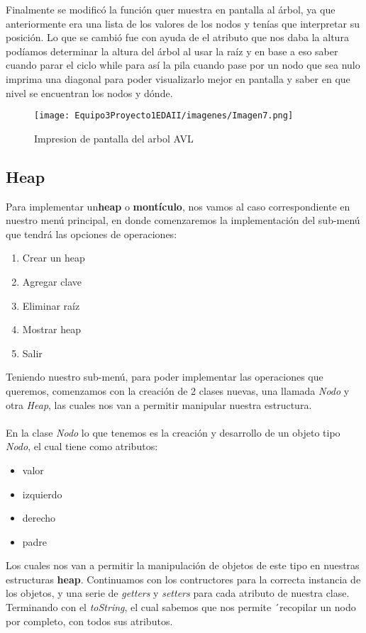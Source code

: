 \documentclass{report}
\begin{document}
Finalmente se modificó la función quer muestra en pantalla al árbol, ya que anteriormente era una lista de los valores de los nodos y tenías que interpretar su posición. Lo que se cambió fue con ayuda de el atributo que nos daba la altura podíamos determinar la altura del árbol al usar la raíz y en base a eso saber cuando parar el ciclo while para así la pila cuando pase por un nodo que sea nulo imprima una diagonal para poder visualizarlo mejor en pantalla y saber en que nivel se encuentran los nodos y dónde.
\begin{figure}[h]
        \centering
        \texttt{[image: Equipo3Proyecto1EDAII/imagenes/Imagen7.png]}
        \caption{Impresion de pantalla del arbol AVL}
        \label{fig:my_label}
\end{figure}


\subsection{Heap}
Para implementar un\textbf{heap} o \textbf{montículo}, nos vamos al caso correspondiente en nuestro menú principal, en donde comenzaremos la implementación del sub-menú que tendrá las opciones de operaciones:
\begin{enumerate}
    \item Crear un heap
    \item Agregar clave
    \item Eliminar raíz
    \item Mostrar heap
    \item Salir
\end{enumerate}
Teniendo nuestro sub-menú, para poder implementar las operaciones que queremos, comenzamos con la creación de 2 clases nuevas, una llamada \textit{Nodo} y otra \textit{Heap}, las cuales nos van a permitir manipular nuestra estructura.\\\\
En la clase \textit{Nodo} lo que tenemos es la creación y desarrollo de un objeto tipo \textit{Nodo}, el cual tiene como atributos:
\begin{itemize}
    \item valor
    \item izquierdo
    \item derecho
    \item padre
\end{itemize}
Los cuales nos van a permitir la manipulación de objetos de este tipo en nuestras estructuras \textbf{heap}. Continuamos con los contructores para la correcta instancia de los objetos, y una serie de \textit{getters} y \textit{setters} para cada atributo de nuestra clase. Terminando con el \textit{toString}, el cual sabemos que nos permite ´recopilar un nodo por completo, con todos sus atributos.\\\\
\end{document}
